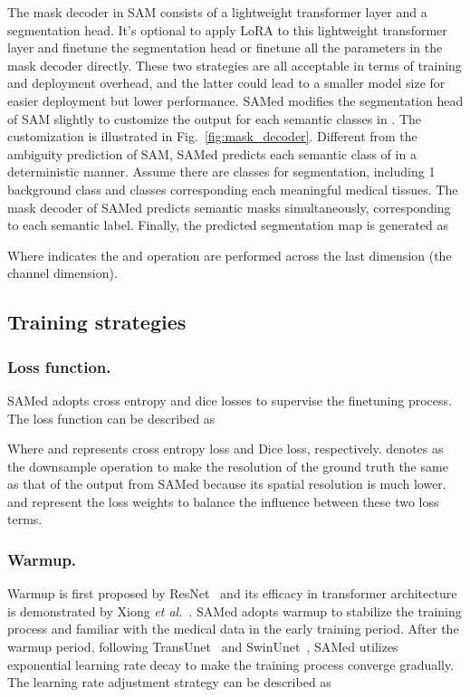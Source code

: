 \documentclass[runningheads]{llncs}
\newcommand{\etal}{\textit{et al.}}
\begin{document}
The mask decoder in SAM consists of a lightweight transformer layer and a segmentation head. It's optional to apply LoRA to this lightweight transformer layer and finetune the segmentation head or finetune all the parameters in the mask decoder directly. These two strategies are all acceptable in terms of training and deployment overhead, and the latter could lead to a smaller model size for easier deployment but lower performance. SAMed modifies the segmentation head of SAM slightly to customize the output for each semantic classes in . The customization is illustrated in Fig.~\ref{fig:mask_decoder}. Different from the ambiguity prediction of SAM, SAMed predicts each semantic class of  in a deterministic manner. Assume there are  classes for segmentation, including 1 background class and  classes corresponding each meaningful medical tissues. The mask decoder of SAMed predicts  semantic masks  simultaneously, corresponding to each semantic label. Finally, the predicted segmentation map is generated as


Where  indicates the  and  operation are performed across the last dimension (the channel dimension).

\subsection{Training strategies}
\subsubsection{Loss function.} SAMed adopts cross entropy and dice losses to supervise the finetuning process. The loss function can be described as


Where  and  represents cross entropy loss and Dice loss, respectively.  denotes as the downsample operation to make the resolution of the ground truth the same as that of the output from SAMed because its spatial resolution is much lower.  and  represent the loss weights to balance the influence between these two loss terms.

\subsubsection{Warmup.} Warmup is first proposed by ResNet~\cite{he2016deep} and its efficacy in transformer architecture is demonstrated by Xiong \etal~\cite{xiong2020layer}. SAMed adopts warmup to stabilize the training process and familiar with the medical data in the early training period. After the warmup period, following TransUnet~\cite{chen2021transunet} and SwinUnet~\cite{swinunet}, SAMed utilizes exponential learning rate decay to make the training process converge gradually. The learning rate adjustment strategy can be described as
\end{document}
